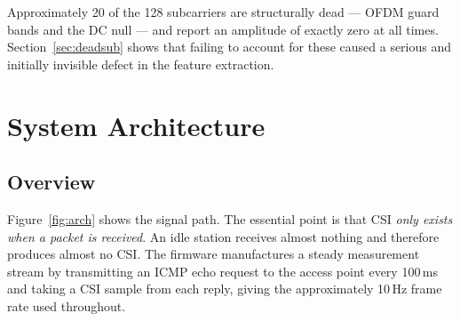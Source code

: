 \documentclass[11pt,a4paper]{article}
\begin{document}
\noindent
Approximately 20 of the 128 subcarriers are structurally dead --- OFDM guard
bands and the DC null --- and report an amplitude of exactly zero at all times.
Section~\ref{sec:deadsub} shows that failing to account for these caused a
serious and initially invisible defect in the feature extraction.

\section{System Architecture}

\subsection{Overview}

Figure~\ref{fig:arch} shows the signal path. The essential point is that CSI
\emph{only exists when a packet is received}. An idle station receives almost
nothing and therefore produces almost no CSI. The firmware manufactures a
steady measurement stream by transmitting an ICMP echo request to the access
point every 100\,ms and taking a CSI sample from each reply, giving the
approximately 10\,Hz frame rate used throughout.
\end{document}
